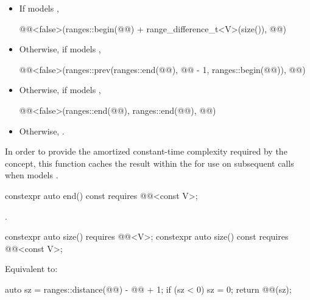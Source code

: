 \begin{itemdescr}
\pnum
\returns
\begin{itemize}
\item
If  models ,
\begin{codeblock}
@@<false>(ranges::begin(@@) + range_difference_t<V>(size()), @@)
\end{codeblock}
\item
Otherwise, if  models ,
\begin{codeblock}
@@<false>(ranges::prev(ranges::end(@@), @@ - 1, ranges::begin(@@)), @@)
\end{codeblock}
\item
Otherwise, if  models ,
\begin{codeblock}
@@<false>(ranges::end(@@), ranges::end(@@), @@)
\end{codeblock}
\item
Otherwise, .
\end{itemize}

\pnum
\remarks
In order to provide the amortized constant-time complexity
required by the  concept,
this function caches the result within the 
for use on subsequent calls
when  models .
\end{itemdescr}

%
\begin{itemdecl}
constexpr auto end() const requires @@<const V>;
\end{itemdecl}

\begin{itemdescr}
\pnum
\returns
{}.
\end{itemdescr}

%
\begin{itemdecl}
constexpr auto size() requires @@<V>;
constexpr auto size() const requires @@<const V>;
\end{itemdecl}

\begin{itemdescr}
\pnum
\effects
Equivalent to:
\begin{codeblock}
auto sz = ranges::distance(@@) - @@ + 1;
if (sz < 0) sz = 0;
return @@(sz);
\end{codeblock}
\end{itemdescr}

